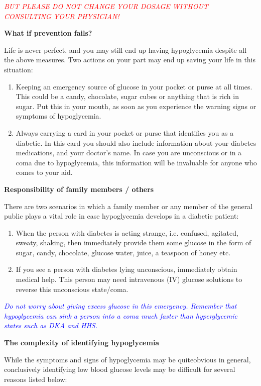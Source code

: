 \textcolor{red}{\textit{BUT PLEASE DO NOT CHANGE YOUR DOSAGE WITHOUT CONSULTING YOUR PHYSICIAN!}}

\noindent\textbf{What if prevention fails?}

Life is never perfect, and you may still end up having hypoglycemia despite all the above measures. Two actions on your part may end up saving your life in this situation:

\begin{enumerate}
\itemsep=0pt
\item Keeping an emergency source of glucose in your pocket or purse at all times. This could be a candy, chocolate, sugar cubes or anything that is rich in sugar. Put this in your mouth, as soon as you experience the warning signs or symptoms of hypoglycemia.
\item Always carrying a card in your pocket or purse that identifies you as a diabetic. In this card you should also include information about your diabetes medications, and your doctor’s name. In case you are unconscious or in a coma due to hypoglycemia, this information will be invaluable for anyone who comes to your aid.
\end{enumerate}

\noindent\textbf{Responsibility of family members / others}

There are two scenarios in which a family member or any member of the general public plays a vital role in case hypoglycemia develops in a diabetic patient:

\begin{enumerate}
\itemsep=0pt
\item When the person with diabetes is acting strange, i.e. confused, agitated, sweaty, shaking, then immediately provide them some glucose in the form of sugar, candy, chocolate, glucose water, juice, a teaspoon of honey etc.
\item If you see a person with diabetes lying unconscious, immediately obtain medical help. This person may need intravenous (IV) glucose solutions to reverse this unconscious state/coma.
\end{enumerate}

\textcolor{blue}{\textit{Do not worry about giving excess glucose in this emergency. Remember that hypoglycemia can sink a person into a coma much faster than hyperglycemic states such as DKA and HHS.}}

\noindent\textbf{The complexity of identifying hypoglycemia}

While the symptoms and signs of hypoglycemia may be quite\break obvious in general, conclusively identifying low blood glucose levels may be difficult for several reasons listed below:

